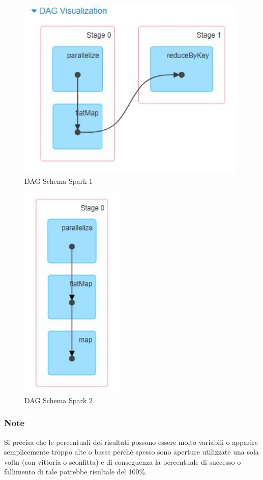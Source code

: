 \documentclass[10pt]{article}
\begin{document}
\begin{figure}[htp]
    \centering
    \includegraphics[width=11cm]{images/z4.JPG}
    \caption{DAG Schema Spark 1}
\end{figure}

\begin{figure}[htp]
    \centering
    \includegraphics[width=5cm]{images/z5.JPG}
    \caption{DAG Schema Spark 2}
\end{figure}

\subsubsection{Note}

Si precisa che le percentuali dei risultati possono essere molto variabili o apparire semplicemente troppo alte o basse perch\`e spesso sono aperture utilizzate una sola volta (con vittoria o sconfitta) e di conseguenza la percentuale di successo o fallimento di tale potrebbe risultale del 100\%.
\end{document}
